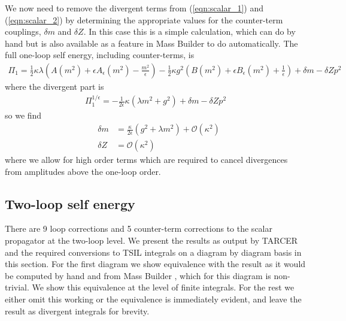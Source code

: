 \documentclass[11pt]{article}
\newcommand{\mb}{\textsf{Mass Builder} \! }
\newcommand{\tsil}{\textsf{TSIL} \! }
\newcommand{\tarcer}{\textsf{TARCER} \! }
\begin{document}
We now need to remove the divergent terms from (\ref{eqn:scalar_1}) and (\ref{eqn:scalar_2}) by determining the appropriate values for the counter-term couplings, $\delta m$ and $\delta Z$.  In this case this is a simple calculation, which can do by hand but is also available as a feature in \mb to do automatically.  The full one-loop self energy, including counter-terms, is
 \begin{align}
 \Pi_1 = \frac{1}{2}\kappa\lambda\left(A(m^2)+\epsilon A_{\epsilon}(m^2)-\frac{m^2}{\epsilon}\right)- \frac{1}{2}\kappa g^2\left(B(m^2)+\epsilon B_{\epsilon}(m^2)+\frac{1}{\epsilon}\right)+ \delta m - \delta Z p^2
 \end{align}
where the divergent part is
\begin{align}
\Pi_1^{1/\epsilon}=  -\frac{1}{2\epsilon}\kappa\left(\lambda m^2+g^2\right)+ \delta m - \delta Z p^2
\end{align}
so we find
\begin{eqnarray}
&\delta m &=\frac{\kappa}{2\epsilon} \left(g^2+\lambda m^2\right)+\mathcal{O}(\kappa^2)\\
&\delta Z &= \mathcal{O}(\kappa^2)
\end{eqnarray}
where we allow for high order terms which are required to cancel divergences from amplitudes above the one-loop order.\\

\subsection{Two-loop self energy}

There are 9 loop corrections and 5 counter-term corrections to the scalar propagator at the two-loop level.  We present the results as output by \tarcer and the required conversions to \tsil integrals on a diagram by diagram basis in this section.  For the first diagram we show equivalence with the result as it would be computed by hand and from \mb, which for this diagram is non-trivial.  We show this equivalence at the level of finite integrals.  For the rest we either omit this working or the equivalence is immediately evident, and leave the result as divergent integrals for brevity.
\end{document}
